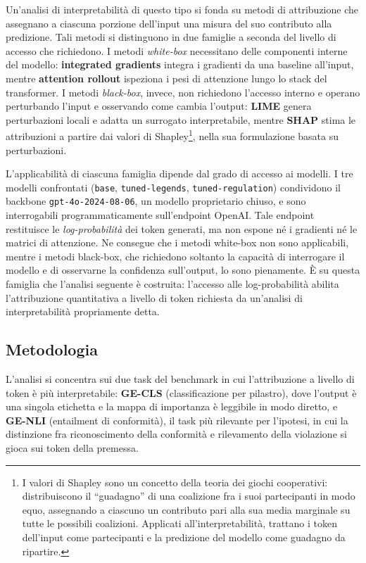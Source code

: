 \documentclass[pdflatex, sn-apa]{sn-jnl}%
\theoremstyle{thmstyleone}%
\theoremstyle{thmstyletwo}%
\theoremstyle{thmstylethree}%
\newcommand{\modelbase}{\texttt{base}}
\newcommand{\modellegends}{\texttt{tuned-legends}}
\newcommand{\modelreg}{\texttt{tuned-regulation}}
\begin{document}
Un'analisi di interpretabilità di questo tipo si fonda su metodi di attribuzione
che assegnano a ciascuna porzione dell'input una misura del suo contributo alla
predizione. Tali metodi si distinguono in due famiglie a seconda del livello di
accesso che richiedono. I metodi \emph{white-box} necessitano delle componenti
interne del modello: \textbf{integrated gradients}
integra i gradienti da una baseline all'input, mentre \textbf{attention
rollout} ispeziona i pesi di attenzione lungo lo stack
del transformer. I metodi \emph{black-box}, invece, non richiedono l'accesso
interno e operano perturbando l'input e osservando come cambia l'output:
\textbf{LIME} genera perturbazioni locali e adatta un
surrogato interpretabile, mentre \textbf{SHAP} stima le
attribuzioni a partire dai valori di Shapley\footnote{I valori di Shapley
sono un concetto della teoria dei giochi cooperativi: distribuiscono
il ``guadagno'' di una coalizione fra i suoi partecipanti in modo equo,
assegnando a ciascuno un contributo pari alla sua media marginale su tutte
le possibili coalizioni. Applicati all'interpretabilità, trattano i token
dell'input come partecipanti e la predizione del modello come guadagno da
ripartire.}, nella sua formulazione basata su
perturbazioni.

L'applicabilità di ciascuna famiglia dipende dal grado di accesso ai modelli. I
tre modelli confrontati (\modelbase{}, \modellegends{}, \modelreg{}) condividono
il backbone \texttt{gpt-4o-2024-08-06}, un modello proprietario chiuso, e sono
interrogabili programmaticamente sull'endpoint OpenAI. Tale endpoint restituisce
le \emph{log-probabilità} dei token generati, ma non espone né i gradienti né le
matrici di attenzione. Ne consegue che i metodi white-box non sono applicabili,
mentre i metodi black-box, che richiedono soltanto la capacità di interrogare
il modello e di osservarne la confidenza sull'output, lo sono pienamente. È su
questa famiglia che l'analisi seguente è costruita: l'accesso alle
log-probabilità abilita l'attribuzione quantitativa a livello di token richiesta
da un'analisi di interpretabilità propriamente detta.


\subsection{Metodologia}
\label{sec:xai:method}

L'analisi si concentra sui due task del benchmark in cui l'attribuzione a livello
di token è più interpretabile: \textbf{GE-CLS} (classificazione per pilastro),
dove l'output è una singola etichetta e la mappa di importanza è leggibile in modo
diretto, e \textbf{GE-NLI} (entailment di conformità), il task più rilevante per
l'ipotesi, in cui la distinzione fra riconoscimento della conformità e rilevamento
della violazione si gioca sui token della premessa.
\end{document}
